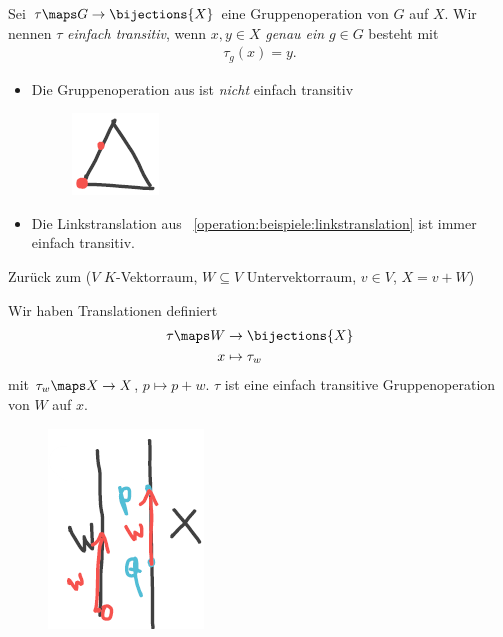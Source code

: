 \begin{definition*}
    Sei \( \tau\maps G\to \bijections{X} \) eine Gruppenoperation von \( G \) auf \( X \). 
    Wir nennen \( \tau \) \emph{einfach transitiv}, wenn \tforall \( x,y\in X \) \emph{genau ein} \( g\in G \) besteht mit
    \begin{align*}
        \tau_g(x)=y.
    \end{align*}
\end{definition*}
\begin{beispiel*}
    \begin{itemize}
        \item Die Gruppenoperation aus  ist \emph{nicht} einfach transitiv
        \begin{figure}[H]
            \centering
            \includegraphics[width=0.2\linewidth]{figures/d_3_nicht_einfach_transitiv}
            \label{fig:d_3_nicht_einfach_transitiv}
        \end{figure}
        
        \item Die Linkstranslation aus ~\ref{operation:beispiele:linkstranslation} ist immer einfach transitiv.
    \end{itemize}
\end{beispiel*}
Zurück zum  (\( V \) \( K \)-Vektorraum, \( W\subseteq V \) Untervektorraum, \( v\in V \), \( X=v+W \))

Wir haben Translationen definiert
\begin{align*}
    \tau\maps \begin{aligned}[t] 
        W&\to \bijections{X}\\
        x&\mapsto \tau_w
    \end{aligned}
\end{align*}
mit \( \tau_w\maps X\to X \), \( p\mapsto p+w \). 
\( \tau \) ist eine einfach transitive Gruppenoperation von \( W \) auf \( x \).

\begin{figure}[H]
    \centering
    \includegraphics[width=0.2\linewidth]{figures/affiner_unterraum_einfach_transitive_gruppenoperation}
    \label{fig:affiner_unterraum_einfach_transitive_gruppenoperation}
\end{figure}

